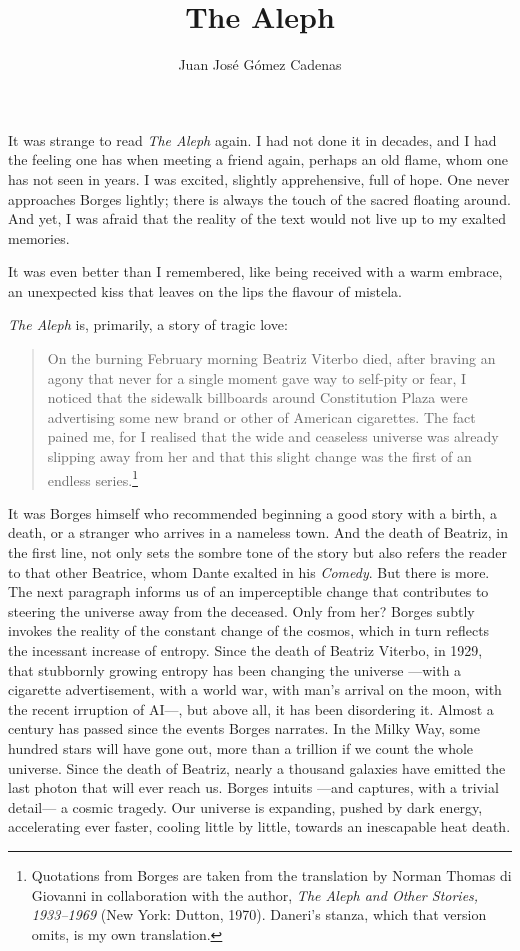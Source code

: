 \documentclass[11pt,a4paper]{article}
\title{The Aleph}
\author{Juan José Gómez Cadenas}
\date{}
\begin{document}
\maketitle

It was strange to read \emph{The Aleph} again. I had not done it in decades, and I had the feeling one has when meeting a friend again, perhaps an old flame, whom one has not seen in years. I was excited, slightly apprehensive, full of hope. One never approaches Borges lightly; there is always the touch of the sacred floating around. And yet, I was afraid that the reality of the text would not live up to my exalted memories.

It was even better than I remembered, like being received with a warm embrace, an unexpected kiss that leaves on the lips the flavour of mistela.

\emph{The Aleph} is, primarily, a story of tragic love:

\begin{quotation}
On the burning February morning Beatriz Viterbo died, after braving an agony that never for a single moment gave way to self-pity or fear, I noticed that the sidewalk billboards around Constitution Plaza were advertising some new brand or other of American cigarettes. The fact pained me, for I realised that the wide and ceaseless universe was already slipping away from her and that this slight change was the first of an endless series.\footnote{Quotations from Borges are taken from the translation by Norman Thomas di Giovanni in collaboration with the author, \emph{The Aleph and Other Stories, 1933--1969} (New York: Dutton, 1970). Daneri's stanza, which that version omits, is my own translation.}
\end{quotation}

It was Borges himself who recommended beginning a good story with a birth, a death, or a stranger who arrives in a nameless town. And the death of Beatriz, in the first line, not only sets the sombre tone of the story but also refers the reader to that other Beatrice, whom Dante exalted in his \emph{Comedy}. But there is more. The next paragraph informs us of an imperceptible change that contributes to steering the universe away from the deceased. Only from her? Borges subtly invokes the reality of the constant change of the cosmos, which in turn reflects the incessant increase of entropy. Since the death of Beatriz Viterbo, in 1929, that stubbornly growing entropy has been changing the universe ---with a cigarette advertisement, with a world war, with man's arrival on the moon, with the recent irruption of AI---, but above all, it has been disordering it. Almost a century has passed since the events Borges narrates. In the Milky Way, some hundred stars will have gone out, more than a trillion if we count the whole universe. Since the death of Beatriz, nearly a thousand galaxies have emitted the last photon that will ever reach us. Borges intuits ---and captures, with a trivial detail--- a cosmic tragedy. Our universe is expanding, pushed by dark energy, accelerating ever faster, cooling little by little, towards an inescapable heat death.
\end{document}
